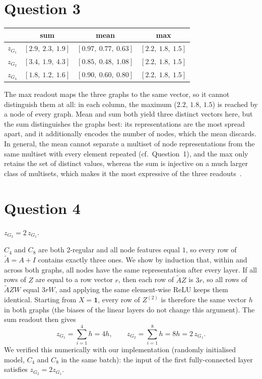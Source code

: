 \documentclass[a4paper]{article}
\begin{document}
\section{Question 3}

\begin{center}
\begin{tabular}{c|c|c|c}
     & sum & mean & max \\
    \hline
    $z_{G_1}$ & $[2.9,\ 2.3,\ 1.9]$ & $[0.97,\ 0.77,\ 0.63]$ & $[2.2,\ 1.8,\ 1.5]$ \\
    $z_{G_2}$ & $[3.4,\ 1.9,\ 4.3]$ & $[0.85,\ 0.48,\ 1.08]$ & $[2.2,\ 1.8,\ 1.5]$ \\
    $z_{G_3}$ & $[1.8,\ 1.2,\ 1.6]$ & $[0.90,\ 0.60,\ 0.80]$ & $[2.2,\ 1.8,\ 1.5]$ \\
\end{tabular}
\end{center}

The max readout maps the three graphs to the same vector, so it cannot distinguish them at all: in each column, the maximum ($2.2$, $1.8$, $1.5$) is reached by a node of every graph. Mean and sum both yield three distinct vectors here, but the sum distinguishes the graphs best: its representations are the most spread apart, and it additionally encodes the number of nodes, which the mean discards. In general, the mean cannot separate a multiset of node representations from the same multiset with every element repeated (cf.\ Question~1), and the max only retains the set of distinct values, whereas the sum is injective on a much larger class of multisets, which makes it the most expressive of the three readouts~\cite{xu2019powerful}.


\section{Question 4}

$z_{G_2} = 2\, z_{G_1}$.

$C_4$ and $C_8$ are both 2-regular and all node features equal $1$, so every row of $\tilde{A} = A + I$ contains exactly three ones. We show by induction that, within and across both graphs, all nodes have the same representation after every layer. If all rows of $Z$ are equal to a row vector $r$, then each row of $\tilde{A} Z$ is $3r$, so all rows of $\tilde{A} Z W$ equal $3rW$, and applying the same element-wise ReLU keeps them identical. Starting from $X = \mathbf{1}$, every row of $Z^{(2)}$ is therefore the same vector $h$ in both graphs (the biases of the linear layers do not change this argument). The sum readout then gives
\begin{equation}
    z_{G_1} = \sum_{i=1}^{4} h = 4h, \qquad z_{G_2} = \sum_{i=1}^{8} h = 8h = 2\, z_{G_1}.
\end{equation}
We verified this numerically with our implementation (randomly initialised model, $C_4$ and $C_8$ in the same batch): the input of the first fully-connected layer satisfies $z_{G_2} = 2 z_{G_1}$.
\end{document}
